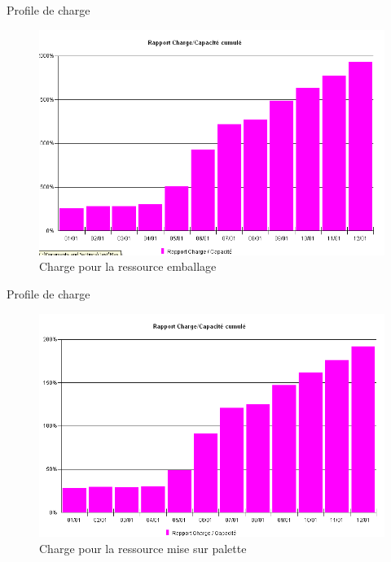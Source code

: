 \begin{frame}{Profile de charge}
\begin{figure}[H]
\centering
\includegraphics[scale=0.4]{../Organisationnelle/captures/charge_emb.PNG}
\caption{Charge pour la ressource emballage}
\end{figure}
\end{frame}

\begin{frame}{Profile de charge}
\begin{figure}[H]
\centering
\includegraphics[scale=0.4]{../Organisationnelle/captures/charge_pal.png}
\caption{Charge pour la ressource mise sur palette}
\end{figure}
\end{frame}